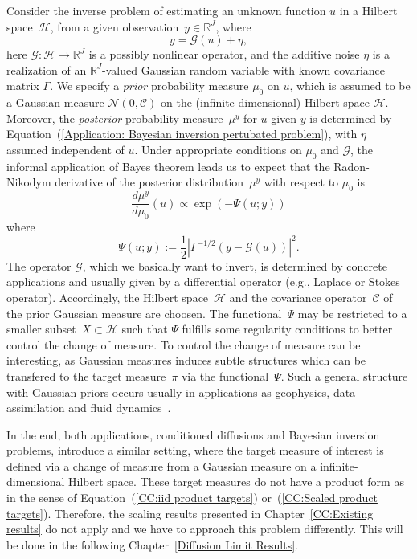 Consider the inverse problem of estimating an unknown function $u$ in a Hilbert space~$\mathcal{H}$, from a given observation~$y \in \mathbb{R}^J$, where
 \begin{equation}
  \label{Application: Bayesian inversion pertubated problem}
  y = \mathcal{G}(u) + \eta,
\end{equation}
here $\mathcal{G}: \mathcal{H} \to \mathbb{R}^J$ is a possibly nonlinear operator, and the additive noise $\eta$ is a realization of an $\mathbb{R}^J$-valued Gaussian random variable with known covariance matrix $\Gamma$. We specify a \textit{prior} probability measure $\mu_0$  on $u$, which is assumed to be a Gaussian measure $ \mathcal{N}(0, \mathcal{C}) $ on the (infinite-dimensional) Hilbert space $\mathcal{H}$. Moreover, the \textit{posterior} probability measure~$\mu^y$ for $u$ given $y$ is determined by Equation~(\ref{Application: Bayesian inversion pertubated problem}), with $\eta$ assumed independent of $u$. Under appropriate conditions on $\mu_0$ and $\mathcal{G}$, the informal application of Bayes theorem leads us to expect that the Radon-Nikodym derivative of the posterior distribution~$\mu^y$ with respect to $\mu_0$ is
\begin{equation}
 \frac{d \mu^y}{d \mu_0}(u) \varpropto \exp (- \Psi(u; y))
\end{equation}
where
\begin{equation}
 \Psi (u;y) := \frac{1}{2} \left| \Gamma^{-1/2} (y- \mathcal{G}(u)) \right|^2.
\end{equation}
The operator $\mathcal{G}$, which we basically want to invert, is determined by concrete applications and usually given by a differential operator (e.g., Laplace or Stokes operator). Accordingly, the Hilbert space~$\mathcal{H}$ and the covariance operator~$\mathcal{C}$ of the prior Gaussian measure are choosen. The functional~$\Psi$ may be restricted to a smaller subset~$X \subset \mathcal{H}$ such that $\Psi$ fulfills some regularity conditions to better control the change of measure. To control the change of measure can be interesting, as Gaussian measures induces subtle structures which can be transfered to the target measure~$\pi$ via the functional~$\Psi$. Such a general structure with Gaussian priors occurs usually in applications as geophysics, data assimilation and fluid dynamics~\autocite{Beskos2009, Dashti2012, Stuart2010}.
\newline

In the end, both applications, conditioned diffusions and Bayesian inversion problems, introduce a similar setting, where the target measure of interest is defined via a change of measure from a Gaussian measure on a infinite-dimensional Hilbert space. These target measures do not have a product form as in the sense of Equation~(\ref{CC:iid product targets}) or~(\ref{CC:Scaled product targets}). Therefore, the scaling results presented in Chapter~\ref{CC:Existing results} do not apply and we have to approach this problem differently. This will be done in the following Chapter~\ref{Diffusion Limit Results}.

